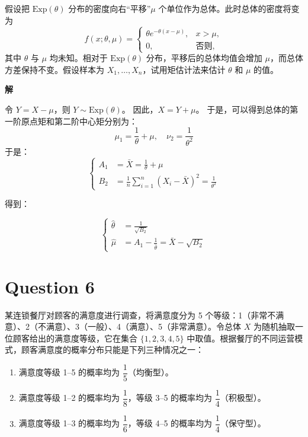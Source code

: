 \documentclass[12pt,a4paper]{article}
\begin{document}
\subsection{}

假设把 $\mathrm{Exp}(\theta)$ 分布的密度向右“平移”$\mu$ 个单位作为总体。此时总体的密度将变为
    \[
        f(x;\theta,\mu)=
        \begin{cases}
            \theta e^{-\theta(x-\mu)}, & x>\mu,\\
            0, & \text{否则},
        \end{cases}
    \]
    其中 $\theta$ 与 $\mu$ 均未知。相对于 $\mathrm{Exp}(\theta)$ 分布，平移后的总体均值会增加 $\mu$，而总体方差保持不变。假设样本为 $X_1,\ldots,X_n$，试用矩估计法来估计 $\theta$ 和 $\mu$ 的值。

\begin{answerbox}
\textbf{解}  

  令 $Y = X - \mu$，则 $Y \sim \mathrm{Exp}(\theta)$。
  因此，$X = Y + \mu$。
  于是，可以得到总体的第一阶原点矩和第二阶中心矩分别为：
  $$
  \mu_1 = \frac{1}{\theta} + \mu, \quad \nu_2 = \frac{1}{\theta^2}
  $$
  于是：
  $$
  \left\{
  \begin{aligned}
    A_1 &= \bar{X} = \frac{1}{\theta} + \mu \\
    B_2 &= \frac{1}{n}\sum_{i=1}^n (X_i-\bar{X})^2 = \frac{1}{\theta^2}
  \end{aligned}\right.
  $$

  得到：

  $$
  \left\{
  \begin{aligned}
    \hat{\theta} &= \frac{1}{\sqrt{B_2}} \\
    \hat{\mu} &= A_1 - \frac{1}{\hat{\theta}} = \bar{X} - \sqrt{B_2}
  \end{aligned}
  \right.
  $$
\end{answerbox}

\section{Question 6}

某连锁餐厅对顾客的满意度进行调查，将满意度分为 5 个等级：1（非常不满意）、2（不满意）、3（一般）、4（满意）、5（非常满意）。令总体 $X$ 为随机抽取一位顾客给出的满意度等级，它在集合 $\{1,2,3,4,5\}$ 中取值。根据餐厅的不同运营模式，顾客满意度的概率分布只能是下列三种情况之一：

\begin{enumerate}[label=(\arabic*), leftmargin=3em]
    \item 满意度等级 1--5 的概率均为 $\dfrac{1}{5}$（均衡型）。
    \item 满意度等级 1--2 的概率均为 $\dfrac{1}{8}$，等级 3--5 的概率均为 $\dfrac{1}{4}$（积极型）。
    \item 满意度等级 1--3 的概率均为 $\dfrac{1}{6}$，等级 4--5 的概率均为 $\dfrac{1}{4}$（保守型）。
\end{enumerate}
\end{document}
